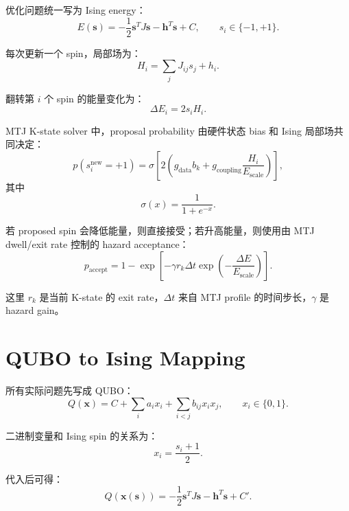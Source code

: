 \documentclass[UTF8]{ctexart}
\begin{document}
优化问题统一写为 Ising energy：
\begin{equation}
E(\bm{s}) =
-\frac{1}{2}\bm{s}^{T}J\bm{s}
-\bm{h}^{T}\bm{s}
+ C,
\qquad
s_i\in\{-1,+1\}.
\end{equation}

每次更新一个 spin，局部场为：
\begin{equation}
H_i = \sum_j J_{ij}s_j + h_i.
\end{equation}

翻转第 $i$ 个 spin 的能量变化为：
\begin{equation}
\Delta E_i = 2s_iH_i.
\end{equation}

MTJ K-state solver 中，proposal probability 由硬件状态 bias 和 Ising 局部场共同决定：
\begin{equation}
p(s_i^{\mathrm{new}}=+1)
=
\sigma\left[
2\left(
g_{\mathrm{data}}b_k
+
g_{\mathrm{coupling}}
\frac{H_i}{E_{\mathrm{scale}}}
\right)
\right],
\end{equation}
其中
\begin{equation}
\sigma(x)=\frac{1}{1+e^{-x}}.
\end{equation}

若 proposed spin 会降低能量，则直接接受；若升高能量，则使用由 MTJ dwell/exit rate 控制的 hazard acceptance：
\begin{equation}
p_{\mathrm{accept}}
=
1-\exp\left[
-\gamma r_k\Delta t
\exp\left(
-\frac{\Delta E}{E_{\mathrm{scale}}}
\right)
\right].
\end{equation}

这里 $r_k$ 是当前 K-state 的 exit rate，$\Delta t$ 来自 MTJ profile 的时间步长，$\gamma$ 是 hazard gain。

\section{QUBO to Ising Mapping}

所有实际问题先写成 QUBO：
\begin{equation}
Q(\bm{x})=
C+\sum_i a_i x_i
+\sum_{i<j} b_{ij}x_ix_j,
\qquad
x_i\in\{0,1\}.
\end{equation}

二进制变量和 Ising spin 的关系为：
\begin{equation}
x_i=\frac{s_i+1}{2}.
\end{equation}

代入后可得：
\begin{equation}
Q(\bm{x}(\bm{s}))
=
-\frac{1}{2}\bm{s}^{T}J\bm{s}
-\bm{h}^{T}\bm{s}
+C'.
\end{equation}
\end{document}
